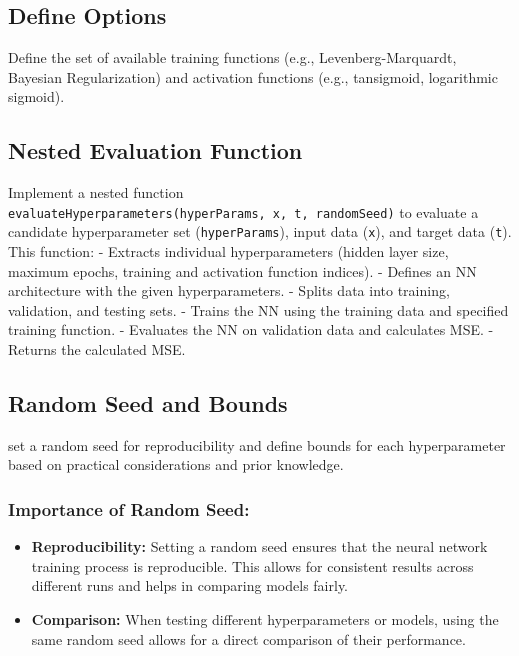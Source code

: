 \documentclass[
  super,
  review,
  3p]{elsarticle}
\providecommand{\tightlist}{%
  \setlength{\itemsep}{0pt}\setlength{\parskip}{0pt}}\usepackage{longtable,booktabs,array}
\begin{document}
\subsection{Define Options}\label{define-options}

Define the set of available training functions (e.g.,
Levenberg-Marquardt, Bayesian Regularization) and activation functions
(e.g., tansigmoid, logarithmic sigmoid).

\subsection{Nested Evaluation
Function}\label{nested-evaluation-function}

Implement a nested function
\texttt{evaluateHyperparameters(hyperParams,\ x,\ t,\ randomSeed)} to
evaluate a candidate hyperparameter set (\texttt{hyperParams}), input
data (\texttt{x}), and target data (\texttt{t}). This function: -
Extracts individual hyperparameters (hidden layer size, maximum epochs,
training and activation function indices). - Defines an NN architecture
with the given hyperparameters. - Splits data into training, validation,
and testing sets. - Trains the NN using the training data and specified
training function. - Evaluates the NN on validation data and calculates
MSE. - Returns the calculated MSE.

\subsection{Random Seed and Bounds}\label{random-seed-and-bounds}

set a random seed for reproducibility and define bounds for each
hyperparameter based on practical considerations and prior knowledge.

\subsubsection{Importance of Random
Seed:}\label{importance-of-random-seed}

\begin{itemize}
\tightlist
\item
  \textbf{Reproducibility:} Setting a random seed ensures that the
  neural network training process is reproducible. This allows for
  consistent results across different runs and helps in comparing models
  fairly.
\item
  \textbf{Comparison:} When testing different hyperparameters or models,
  using the same random seed allows for a direct comparison of their
  performance.
\end{itemize}
\end{document}
